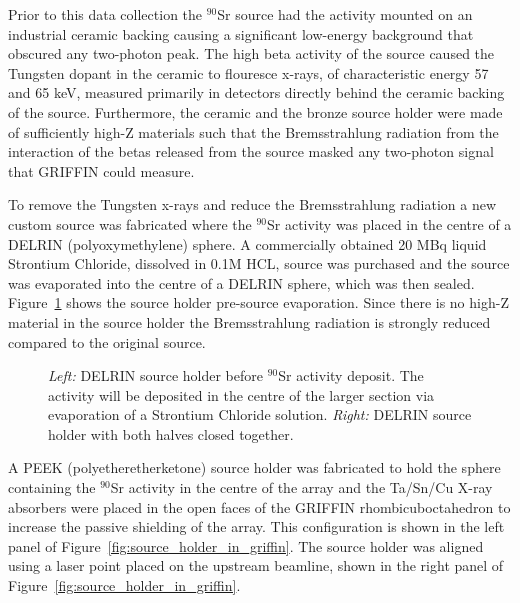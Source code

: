 \documentclass[cnatzke_thesis_proposal.tex]{subfiles}
\begin{document}
Prior to this data collection the $^{90}$Sr source had the activity mounted on an industrial ceramic backing causing a significant low-energy background that obscured any two-photon peak. 
The high beta activity of the source caused the Tungsten dopant in the ceramic to flouresce x-rays, of characteristic energy 57 and 65 keV, measured primarily in detectors directly behind the ceramic backing of the source. 
Furthermore, the ceramic and the bronze source holder were made of sufficiently high-Z materials such that the Bremsstrahlung radiation from the interaction of the betas released from the source masked any two-photon signal that GRIFFIN could measure. 

To remove the Tungsten x-rays and reduce the Bremsstrahlung radiation a new custom source was fabricated where the $^{90}$Sr activity was placed in the centre of a DELRIN (polyoxymethylene) sphere. 
A commercially obtained 20 MBq liquid Strontium Chloride, dissolved in 0.1M HCL, source was purchased and the source was evaporated into the centre of a DELRIN sphere, which was then sealed. 
Figure~\ref{fig:source_holder} shows the source holder pre-source evaporation. 
Since there is no high-Z material in the source holder the Bremsstrahlung radiation is strongly reduced compared to the original source. 


\begin{figure}[htbp]
  \centering
  \qquad
  \caption{
    \textit{Left:} DELRIN source holder before $^{90}$Sr activity deposit. The activity will be deposited in the centre of the larger section via evaporation of a Strontium Chloride solution. 
    \textit{Right:} DELRIN source holder with both halves closed together.
  }
  \label{fig:source_holder}
\end{figure}

A PEEK (polyetheretherketone) source holder was fabricated to hold the sphere containing the $^{90}$Sr activity in the centre of the array and the Ta/Sn/Cu X-ray absorbers were placed in the open faces of the GRIFFIN rhombicuboctahedron to increase the passive shielding of the array. This configuration is shown in the left panel of Figure~\ref{fig:source_holder_in_griffin}. The source holder was aligned using a laser point placed on the upstream beamline, shown in the right panel of Figure~\ref{fig:source_holder_in_griffin}.
\end{document}
